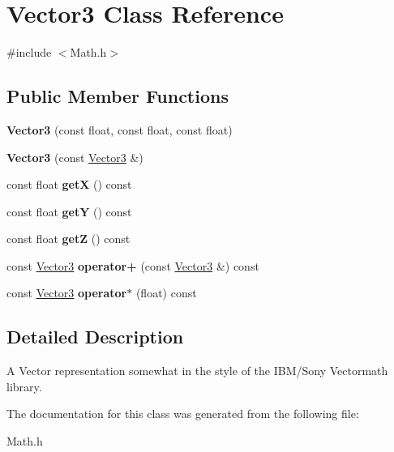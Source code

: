 \hypertarget{classVector3}{}\section{Vector3 Class Reference}
\label{classVector3}


{\ttfamily \#include $<$Math.\+h$>$}

\subsection*{Public Member Functions}
\begin{DoxyCompactItemize}
\item 
\mbox{\label{classVector3_aa2ac7a9dd9ff6523a7decf564d525058}} 
{\bfseries Vector3} (const float, const float, const float)
\item 
\mbox{\label{classVector3_af327009e11b3169bb2d825e8ea5cbd6b}} 
{\bfseries Vector3} (const \hyperlink{classVector3}{Vector3} \&)
\item 
\mbox{\label{classVector3_a0e0fe85e0cf7a1bbe8f88b124ba75247}} 
const float {\bfseries getX} () const
\item 
\mbox{\label{classVector3_af469b793596e9222177f2b19468db175}} 
const float {\bfseries getY} () const
\item 
\mbox{\label{classVector3_afa596479a0e9009955d504554e2a43ce}} 
const float {\bfseries getZ} () const
\item 
\mbox{\label{classVector3_a94f315ca92708d8430bb1ff9fedae0a8}} 
const \hyperlink{classVector3}{Vector3} {\bfseries operator+} (const \hyperlink{classVector3}{Vector3} \&) const
\item 
\mbox{\label{classVector3_a9d6e8d93fb365ae671053eff9a909fa6}} 
const \hyperlink{classVector3}{Vector3} {\bfseries operator$\ast$} (float) const
\end{DoxyCompactItemize}


\subsection{Detailed Description}
A Vector representation somewhat in the style of the I\+B\+M/\+Sony Vectormath library. 

The documentation for this class was generated from the following file\+:\begin{DoxyCompactItemize}
\item 
Math.\+h\end{DoxyCompactItemize}
